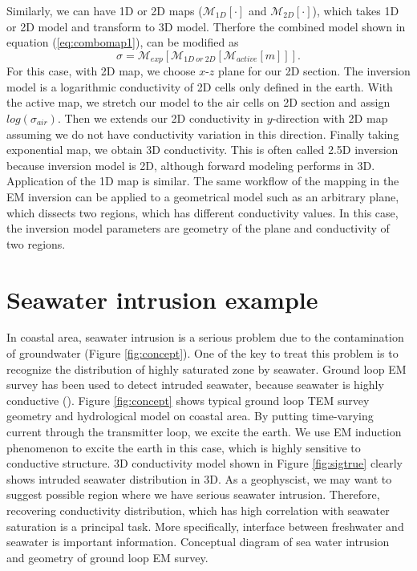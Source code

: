 \documentclass{segabs}
\begin{document}
Similarly, we can have 1D or 2D maps ($\mathcal{M}_{1D}[\cdot]$ and $\mathcal{M}_{2D}[\cdot]$), which takes 1D or 2D model and transform to 3D model. Therfore the combined model shown in equation (\ref{eq:combomap1}), can be modified as
\begin{equation}
  \sigma = \mathcal{M}_{exp}[\mathcal{M}_{1D \ or \ 2D}[\mathcal{M}_{active}[m]]].
  \label{eq:combomap2}
\end{equation}
For this case, with 2D map, we choose $x$-$z$ plane for our 2D section. The inversion model is a logarithmic conductivity of 2D cells only defined in the earth. With the active map, we stretch our model to the air cells on 2D section and assign $log(\sigma_{air})$. Then we extends our 2D conductivity in $y$-direction with 2D map assuming we do not have conductivity variation in this direction. Finally taking exponential map, we obtain 3D conductivity. This is often called 2.5D inversion because inversion model is 2D, although forward modeling performs in 3D. Application of the 1D map is similar. The same workflow of the mapping in the EM inversion can be applied to a geometrical model such as an arbitrary plane, which dissects two regions, which has different conductivity values. In this case, the inversion model parameters are geometry of the plane and conductivity of two regions.  


\section*{Seawater intrusion example}
In coastal area, seawater intrusion is a serious problem due to the contamination of groundwater (Figure \ref{fig:concept}). One of the key to treat this problem is to recognize the distribution of highly saturated zone by seawater. Ground loop EM survey has been used to detect intruded seawater, because seawater is highly conductive (\cite{Mills1988}). Figure \ref{fig:concept} shows typical ground loop TEM survey geometry and hydrological model on coastal area. By putting time-varying current through the transmitter loop, we excite the earth. We use EM induction phenomenon to excite the earth in this case, which is highly sensitive to conductive structure. 3D conductivity model shown in Figure \ref{fig:sigtrue} clearly shows intruded seawater distribution in 3D. As a geophyscist, we may want to suggest possible region where we have serious seawater intrusion. Therefore, recovering conductivity distribution, which has high correlation with seawater saturation is a principal task. More specifically, interface between freshwater and seawater is important information.
{Conceptual diagram of sea water intrusion and geometry of ground loop EM survey.}
\end{document}
